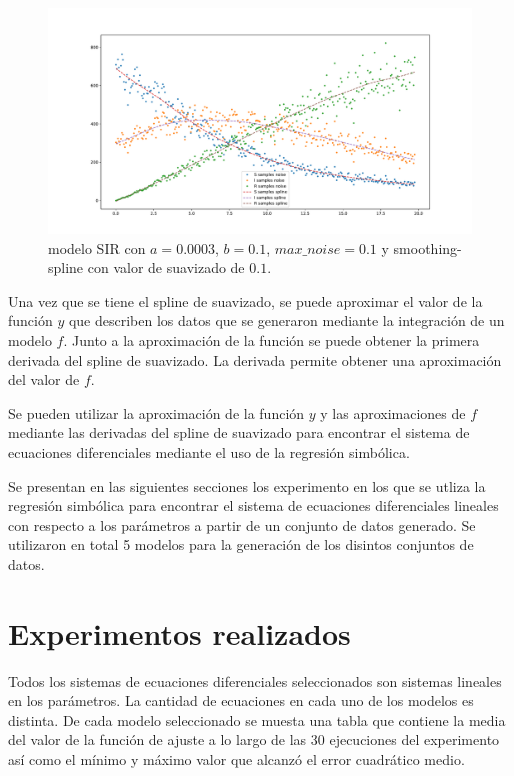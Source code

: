 \begin{figure}[h]
    \centering
    \includegraphics[width=\textwidth]{"figures/SIR_noise_with_spline.pdf"}
    \caption{modelo SIR con $a = 0.0003$, $b = 0.1$, $max\_noise = 0.1$ y smoothing-spline con valor de suavizado de $0.1$.}
    \label{fig:SIR_noise_with_spline}
\end{figure}

Una vez que se tiene el spline de suavizado, se puede aproximar el valor de la función $y$ que describen los datos que se generaron mediante la integración de un modelo $f$. Junto a la aproximación de la función se puede obtener la primera derivada del spline de suavizado. La derivada permite obtener una aproximación del valor de $f$.

Se pueden utilizar la aproximación de la función $y$ y las aproximaciones de $f$ mediante las derivadas del spline de suavizado para encontrar el sistema de ecuaciones diferenciales mediante el uso de la regresión simbólica.

Se presentan en las siguientes secciones los experimento en los que se utliza la regresión simbólica para encontrar el sistema de ecuaciones diferenciales lineales con respecto a los parámetros a partir de un conjunto de datos generado. Se utilizaron en total 5 modelos para la generación de los disintos conjuntos de datos.

\section{Experimentos realizados}\label{section:experiments}

Todos los sistemas de ecuaciones diferenciales seleccionados son sistemas lineales en los parámetros. La cantidad de ecuaciones en cada uno de los modelos es distinta. De cada modelo seleccionado se muesta una tabla que contiene la media del valor de la función de ajuste a lo largo de las 30 ejecuciones del experimento así como el mínimo y máximo valor que alcanzó el error cuadrático medio.

